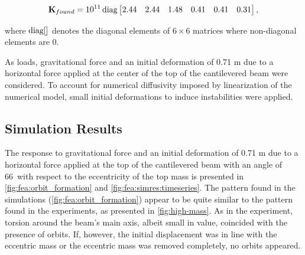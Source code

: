 \documentclass{article}
\begin{document}
\begin{small}
    \begin{equation}
   \mathbf{K}_{found}  = 10^{11}\, \textnormal{diag}
   \begin{bmatrix}
    2.44  &   2.44 &    1.48 &    0.41   &  0.41 &     0.31
   \end{bmatrix},
   \label{eq:fea:K_fnd}
    \end{equation}
\end{small}

where $\textnormal{diag[]}$ denotes the diagonal elements of $6\times6$ matrices where non-diagonal elements are 0.

As loads, gravitational force and an initial deformation of 0.71 m due to a horizontal force applied at the center of the top of the cantilevered beam were considered. To account for numerical diffusivity imposed by linearization of the numerical model, small initial deformations to induce instabilities were applied.

\subsection{Simulation Results}

The response to gravitational force and an initial deformation of 0.71 m due to a horizontal force applied at the top of the  cantilevered beam with an angle of 66\textdegree ~with respect to the eccentricity of the top mass is presented in  \autoref{fig:fea:orbit_formation} and \autoref{fig:fea:simres:timeseries}. The pattern found in the simulations (\autoref{fig:fea:orbit_formation}) appear to be quite similar to the pattern found in the experiments, as presented in  \autoref{fig:high-mass}. As in the experiment, torsion around the beam's main axis, albeit small in value, coincided with the presence of orbits. If, however, the initial displacement was in line with the eccentric mass or the eccentric mass was removed completely, no orbits appeared. 
\end{document}
